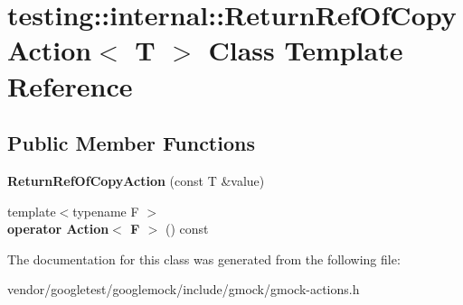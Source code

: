 \hypertarget{classtesting_1_1internal_1_1ReturnRefOfCopyAction}{}\section{testing\+:\+:internal\+:\+:Return\+Ref\+Of\+Copy\+Action$<$ T $>$ Class Template Reference}
\label{classtesting_1_1internal_1_1ReturnRefOfCopyAction}
\subsection*{Public Member Functions}
\begin{DoxyCompactItemize}
\item 
{\bfseries Return\+Ref\+Of\+Copy\+Action} (const T \&value)\hypertarget{classtesting_1_1internal_1_1ReturnRefOfCopyAction_a073c18a8b50423b08f6603e860622839}{}\label{classtesting_1_1internal_1_1ReturnRefOfCopyAction_a073c18a8b50423b08f6603e860622839}

\item 
{\footnotesize template$<$typename F $>$ }\\{\bfseries operator Action$<$ F $>$} () const \hypertarget{classtesting_1_1internal_1_1ReturnRefOfCopyAction_a9d7625cff3c84eedcbbf8ad976d28814}{}\label{classtesting_1_1internal_1_1ReturnRefOfCopyAction_a9d7625cff3c84eedcbbf8ad976d28814}

\end{DoxyCompactItemize}


The documentation for this class was generated from the following file\+:\begin{DoxyCompactItemize}
\item 
vendor/googletest/googlemock/include/gmock/gmock-\/actions.\+h\end{DoxyCompactItemize}
